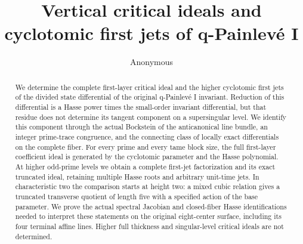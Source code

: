 \documentclass[11pt,letterpaper]{article}
\title{Vertical critical ideals and cyclotomic first jets of q-Painlev\'e I}
\author{Anonymous}
\date{}
\begin{document}
\maketitle
\begin{abstract}
We determine the complete first-layer critical ideal and the higher
cyclotomic first jets of the divided state differential of the original
q-Painlev\'e I invariant. Reduction of this differential is a Hasse
power times the small-order invariant differential, but that residue
does not determine its tangent component on a supersingular level.
We identify this component through the actual Bockstein of the
anticanonical line bundle, an integer prime-trace congruence, and the
connecting class of locally exact differentials on the complete fiber.
For every prime and every tame block size, the full first-layer
coefficient ideal is generated by the cyclotomic parameter and the
Hasse polynomial. At higher odd-prime levels we obtain a complete
first-jet factorization and its exact truncated ideal, retaining
multiple Hasse roots and arbitrary unit-time jets. In characteristic
two the comparison starts at height two: a mixed cubic relation gives
a truncated transverse quotient of length five with a specified action
of the base parameter. We prove the actual spectral Jacobian and
closed-fiber Hasse identifications needed to interpret these statements
on the original eight-center surface, including its four terminal
affine lines. Higher full thickness and singular-level critical ideals
are not determined.
\end{abstract}










\label{LastBodyPage}
\clearpage


\end{document}
